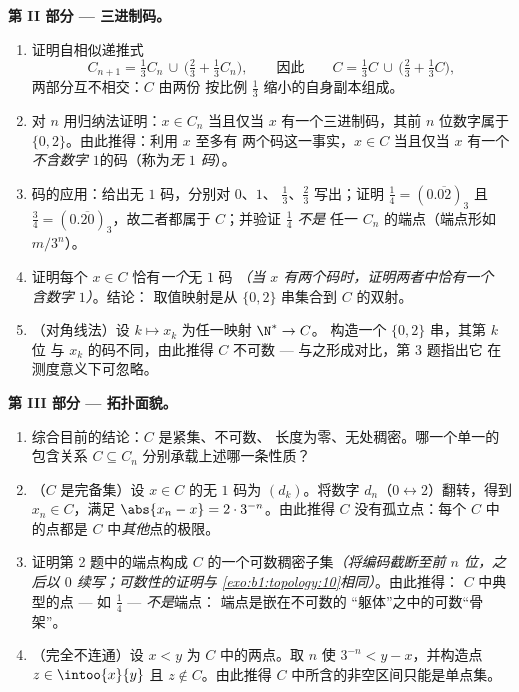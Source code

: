 \begin{problem}[{周末问题 --- 康托尔三分集：
长度为零、不可数、完备，且 $C + C =
\intcc{0}{2}$}]
\medskip
\noindent\textbf{第 II 部分 --- 三进制码。}
\begin{enumerate}[resume]
  \item 证明自相似递推式
        \[
        C_{n+1} = \tfrac13 C_n \,\cup\,
        \bigl(\tfrac23 + \tfrac13 C_n\bigr),
        \qquad\text{因此}\qquad
        C = \tfrac13 C \,\cup\, \bigl(\tfrac23 + \tfrac13
        C\bigr),
        \]
        两部分互不相交：$C$ 由两份
        按比例 $\frac13$ 缩小的自身副本组成。
  \item 对 $n$ 用归纳法证明：$x \in C_n$ 当且仅当
        $x$ 有一个三进制码，其前 $n$ 位数字属于
        $\{0, 2\}$。由此推得：利用 $x$ 至多有
        两个码这一事实，$x \in C$ 当且仅当 $x$ 有一个
        \emph{不含数字 $1$}的码（称为\emph{无 $1$ 码}）。
  \item 码的应用：给出无 $1$ 码，分别对 $0$、$1$、
        $\frac13$、$\frac23$ 写出；证明 $\frac14 = (0.\overline{02})_3$
        且 $\frac34 = (0.\overline{20})_3$，故二者都属于
        $C$；并验证 $\frac14$ \emph{不是}
        任一 $C_n$ 的端点（端点形如 $m/3^n$）。
  \item 证明每个 $x \in C$ 恰有\emph{一个}无 $1$ 码
        \emph{（当 $x$ 有两个码时，证明两者中恰有一个
        含数字 $1$）}。结论：
        取值映射是从 $\{0,2\}$ 串集合到
        $C$ 的双射。
  \item （对角线法）设 $k \mapsto x_k$ 为任一映射 $\N^* \to C$。
        构造一个 $\{0, 2\}$ 串，其第 $k$ 位
        与 $x_k$ 的码不同，由此推得 $C$ 不可数
        --- 与之形成对比，第 3 题指出它
        在测度意义下可忽略。
\end{enumerate}

\medskip
\noindent\textbf{第 III 部分 --- 拓扑面貌。}
\begin{enumerate}[resume]
  \item 综合目前的结论：$C$ 是紧集、不可数、
        长度为零、无处稠密。哪一个单一的包含关系
        $C \subseteq C_n$ 分别承载上述哪一条性质？
  \item （$C$ 是完备集）设 $x \in C$ 的无 $1$ 码为
        $(d_k)$。将数字 $d_n$（$0 \leftrightarrow
        2$）翻转，得到 $x_n \in C$，满足 $\abs{x_n - x} = 2 \cdot
        3^{-n}$。由此推得 $C$ 没有孤立点：每个
        $C$ 中的点都是 $C$ 中\emph{其他}点的极限。
  \item 证明第 2 题中的端点构成
        $C$ 的一个可数稠密子集\emph{（将编码截断至前 $n$
        位，之后以 $0$ 续写；可数性的证明与
        \cref{exo:b1:topology:10}相同）}。由此推得：
        $C$ 中典型的点 --- 如 $\frac14$ --- \emph{不是}端点：
        端点是嵌在不可数的
        “躯体”之中的可数“骨架”。
  \item （完全不连通）设 $x < y$ 为 $C$ 中的两点。取 $n$
        使 $3^{-n} < y - x$，并构造点 $z \in
        \intoo{x}{y}$ 且 $z \notin C$。由此推得
        $C$ 中所含的非空区间只能是单点集。
\end{enumerate}


\end{problem}
